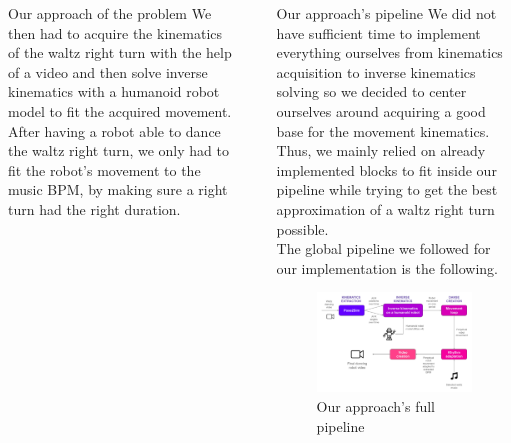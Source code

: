 \documentclass[final]{beamer}
\newlength{\sepwidth}
\newlength{\colwidth}
\newcommand{\separatorcolumn}{\begin{column}{\sepwidth}\end{column}}
\begin{document}
\begin{frame}[t]
\begin{columns}[t]
\begin{column}{\colwidth}
\begin{alertblock}{Our approach of the problem}
We then had to acquire the kinematics of the waltz right turn with the help of a video and then solve inverse kinematics with a humanoid robot model to fit the acquired movement. After having a robot able to dance the waltz right turn, we only had to fit the robot's movement to the music BPM, by making sure a right turn had the right duration.
 \end{alertblock}
 
\end{column}
\separatorcolumn
\begin{column}{\colwidth}
 \begin{block}{Our approach's pipeline}
  We did not have sufficient time to implement everything ourselves from kinematics acquisition to inverse kinematics solving so we decided to center ourselves around acquiring a good base for the movement kinematics. Thus, we mainly relied on already implemented blocks to fit inside our pipeline while trying to get the best approximation of a waltz right turn possible. \\ The global pipeline we followed for our implementation is the following.
  
    \begin{figure}
      \centering
      \includegraphics[width = 0.99 \columnwidth]{img/solution_pipeline.png}
      \caption{Our approach's full pipeline}
    \end{figure}
    
  \end{block}
  

\end{column}
\end{columns}
\end{frame}
\end{document}
